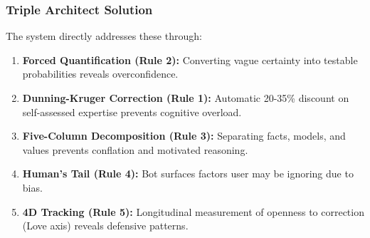 \documentclass[11pt,a4paper]{article}
\theoremstyle{definition}
\theoremstyle{remark}
\begin{document}
\subsubsection{Triple Architect Solution}

The system directly addresses these through:

\begin{enumerate}
    \item \textbf{Forced Quantification (Rule 2):} Converting vague certainty into testable probabilities reveals overconfidence.
    
    \item \textbf{Dunning-Kruger Correction (Rule 1):} Automatic 20-35\% discount on self-assessed expertise prevents cognitive overload.
    
    \item \textbf{Five-Column Decomposition (Rule 3):} Separating facts, models, and values prevents conflation and motivated reasoning.
    
    \item \textbf{Human's Tail (Rule 4):} Bot surfaces factors user may be ignoring due to bias.
    
    \item \textbf{4D Tracking (Rule 5):} Longitudinal measurement of openness to correction (Love axis) reveals defensive patterns.
\end{enumerate}
\end{document}
